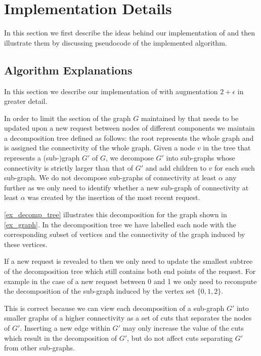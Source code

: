 \documentclass[a4paper,xcolor=dvipsnames, tikz, 12pt]{article}
\newcommand{\crep}{\text{C{\scriptsize REP}}}
\theoremstyle{definition}
\begin{document}
\section{Implementation Details}
\label{implDetSection}
In this section we first describe the ideas behind our implementation of \crep{} and then illustrate them by discussing pseudocode of the implemented algorithm.

\subsection{Algorithm Explanations}

In this section we describe our implementation of \crep{} with augmentation $2+\epsilon$ in greater detail.

In order to limit the section of the graph $G$ maintained by \crep{} that needs to be updated upon a new request between nodes of different components we maintain a decomposition tree defined as follows: the root represents the whole graph and is assigned the connectivity of the whole graph. Given a node $v$ in the tree that represents a (sub-)graph $G'$ of $G$, we decompose $G'$ into sub-graphs whose connectivity is strictly larger than that of $G'$ and add children to $v$ for each such sub-graph. We do not decompose sub-graphs of connectivity at least $\alpha$ any further as we only need to identify whether a new sub-graph of connectivity at least $\alpha$ was created by the insertion of the most recent request.

\cref{ex_decomp_tree} illustrates this decomposition for the graph shown in \cref{ex_graph}. In the decomposition tree we have labelled each node with the corresponding subset of vertices and the connectivity of the graph induced by these vertices.

If a new request is revealed to \crep{} then we only need to update the smallest subtree of the decomposition tree which still contains both end points of the request. For example in the case of a new request between 0 and 1 we only need to recompute the decomposition of the sub-graph induced by the vertex set $\{0,1,2\}$. 

This is correct because we can view each decomposition of a sub-graph $G'$ into smaller graphs of a higher connectivity as a set of cuts that separates the nodes of $G'$. Inserting a new edge within $G'$ may only increase the value of the cuts which result in the decomposition of $G'$, but do not affect cuts separating $G'$ from other sub-graphs.
\end{document}
